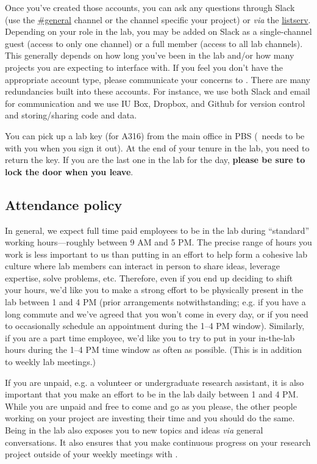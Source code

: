 \documentclass{tufte-book} %
\begin{document}
Once you've created those accounts, you can ask any questions through Slack (use the \href{https://bnbl.slack.com/messages/general/}{\#general} channel or the channel specific your project) or \emph{via} the \href{bnbl-l-subscribe@list.indiana.edu}{listserv}. Depending on your role in the lab, you may be added on Slack as a single-channel guest (access to only one channel) or a full member (access to all lab channels). This generally depends on how long you've been in the lab and/or how many projects you are expecting to interface with. If you feel you don't have the appropriate account type, please communicate your concerns to \director. There are many redundancies built into these accounts. For instance, we use both Slack and email for communication and we use IU Box, Dropbox, and Github for version control and storing/sharing code and data.


\noindent You can pick up a lab key (for A316) from the main office in PBS (\director~needs to be with you when you sign it out). At the end of your tenure in the lab, you need to return the key. If you are the last one in the lab for the day, \textbf{please be sure to lock the door when you leave}.


 \subsection{Attendance policy}
 In general, we expect full time paid employees to be in the lab during ``standard'' working hours---roughly between 9 AM and 5 PM. The precise range of hours you work is less important to us than putting in an effort to help form a cohesive lab culture where lab members can interact in person to share ideas, leverage expertise, solve problems, etc. Therefore, even if you end up deciding to shift your hours, we'd like you to make a strong effort to be physically present in the lab between 1 and 4 PM (prior arrangements notwithstanding; e.g. if you have a long commute and we've agreed that you won't come in every day, or if you need to occasionally schedule an appointment during the 1--4 PM window). Similarly, if you are a part time employee, we'd like you to try to put in your in-the-lab hours during the 1--4 PM time window as often as possible. (This is in addition to weekly lab meetings.)
 
 If you are unpaid, e.g. a volunteer or undergraduate research assistant, it is also important that you make an effort to be in the lab daily between 1 and 4 PM. While you are unpaid and free to come and go as you please, the other people working on your project are investing their time and you should do the same. Being in the lab also exposes you to new topics and ideas \emph{via} general conversations. It also ensures that you make continuous progress on your research project outside of your weekly meetings with \director.
\end{document}
